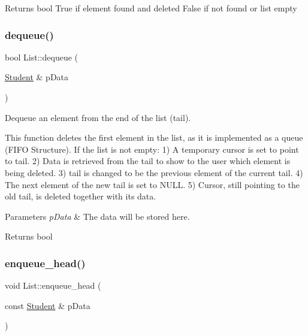 \begin{DoxyReturn}{Returns}
bool True if element found and deleted False if not found or list empty 
\end{DoxyReturn}
\mbox{\label{class_list_addc22172363ef656a20069489a1d003f}} 
\subsubsection{\texorpdfstring{dequeue()}{dequeue()}}
{\footnotesize\ttfamily bool List\+::dequeue (\begin{DoxyParamCaption}\item[{\hyperlink{class_student}{Student} \&}]{p\+Data }\end{DoxyParamCaption})}



Dequeue an element from the end of the list (tail). 

This function deletes the first element in the list, as it is implemented as a queue (F\+I\+FO Structure). If the list is not empty\+: 1) A temporary cursor is set to point to tail. 2) Data is retrieved from the tail to show to the user which element is being deleted. 3) tail is changed to be the previous element of the current tail. 4) The next element of the new tail is set to N\+U\+LL. 5) Cursor, still pointing to the old tail, is deleted together with its data.


\begin{DoxyParams}{Parameters}
{\em p\+Data} & The data will be stored here. \\
\hline
\end{DoxyParams}
\begin{DoxyReturn}{Returns}
bool 
\end{DoxyReturn}
\mbox{\label{class_list_abe1c128f9a438009a7ebe1ff946963cf}} 
\subsubsection{\texorpdfstring{enqueue\+\_\+head()}{enqueue\_head()}}
{\footnotesize\ttfamily void List\+::enqueue\+\_\+head (\begin{DoxyParamCaption}\item[{const \hyperlink{class_student}{Student} \&}]{p\+Data }\end{DoxyParamCaption})}



